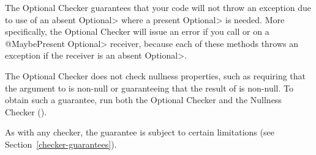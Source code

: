 
The Optional Checker guarantees that your code will not throw an exception
due to use of an absent \<Optional> where a present \<Optional> is needed.
More specifically, the Optional Checker will issue an error if you call
or
on a \<@MaybePresent Optional> receiver, because each of these methods
throws an exception if the receiver is an absent
\<Optional>.

The Optional Checker does not check nullness properties, such as requiring
that the argument to
is non-null or guaranteeing that the result of
is non-null.  To obtain such a guarantee, run both the Optional Checker and
the Nullness Checker ().

As with any checker, the guarantee is subject to certain limitations (see
Section~\ref{checker-guarantees}).


